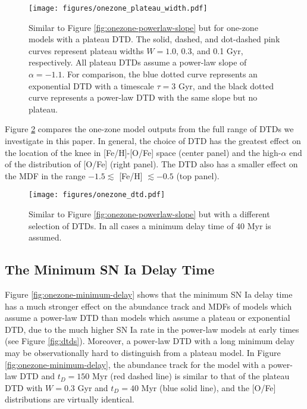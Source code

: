 \documentclass[twocolumn,linenumbers,twocolappendix]{aastex631}
\begin{document}
\begin{figure}
    \centering
    \texttt{[image: figures/onezone\_plateau\_width.pdf]}
    \caption{Similar to Figure \ref{fig:onezone-powerlaw-slope} but for one-zone models with a plateau DTD. The solid, dashed, and dot-dashed pink curves represent plateau widths $W=1.0$, 0.3, and 0.1 Gyr, respectively. All plateau DTDs assume a power-law slope of $\alpha=-1.1$. For comparison, the blue dotted curve represents an exponential DTD with a timescale $\tau=3$ Gyr, and the black dotted curve represents a power-law DTD with the same slope but no plateau.}
    \label{fig:onezone-plateau-width}
\end{figure}

Figure \ref{fig:onezone-dtd} compares the one-zone model outputs from the full range of DTDs we investigate in this paper. In general, the choice of DTD has the greatest effect on the location of the knee in [Fe/H]-[O/Fe] space (center panel) and the high-$\alpha$ end of the distribution of [O/Fe] (right panel). The DTD also has a smaller effect on the MDF in the range $-1.5\lesssim$ [Fe/H] $\lesssim-0.5$ (top panel).

\begin{figure}
    \centering
    \texttt{[image: figures/onezone\_dtd.pdf]}
    \caption{Similar to Figure \ref{fig:onezone-powerlaw-slope} but with a different selection of DTDs. In all cases a minimum delay time of 40 Myr is assumed.}
    \label{fig:onezone-dtd}
\end{figure}

\subsection{The Minimum SN Ia Delay Time}

Figure \ref{fig:onezone-minimum-delay} shows that the minimum SN Ia delay time has a much stronger effect on the abundance track and MDFs of models which assume a power-law DTD than models which assume a plateau or exponential DTD, due to the much higher SN Ia rate in the power-law models at early times (see Figure \ref{fig:dtds}). Moreover, a power-law DTD with a long minimum delay may be observationally hard to distinguish from a plateau model. In Figure \ref{fig:onezone-minimum-delay}, the abundance track for the model with a power-law DTD and $t_D=150$ Myr (red dashed line) is similar to that of the plateau DTD with $W=0.3$ Gyr and $t_D=40$ Myr (blue solid line), and the [O/Fe] distributions are virtually identical.  
\end{document}
